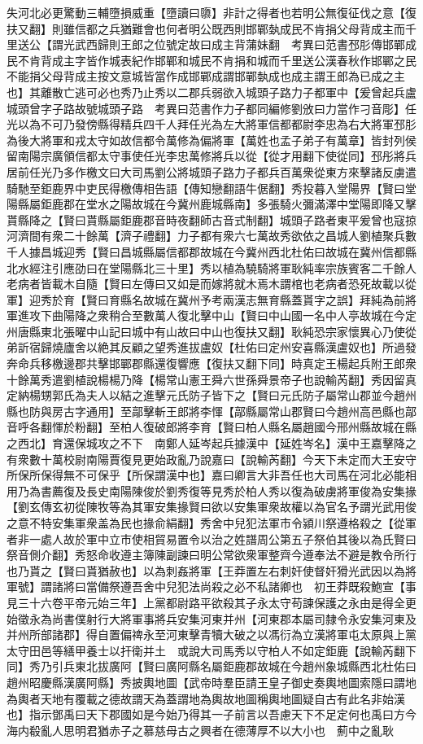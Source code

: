 失河北必更驚動三輔墮損威重【墮讀曰隳】非計之得者也若明公無復征伐之意【復扶又翻】則雖信都之兵猶難會也何者明公既西則邯鄲埶成民不肯捐父母背成主而千里送公【謂光武西歸則王郎之位號定故曰成主背蒲妹翻　考異曰范書邳肜傳邯鄲成民不肯背成主字皆作城表紀作邯鄲和城民不肯捐和城而千里送公漢春秋作邯鄲之民不能捐父母背成主按文意城皆當作成邯鄲成謂邯鄲埶成也成主謂王郎為已成之主也】其離散亡逃可必也秀乃止秀以二郡兵弱欲入城頭子路力子都軍中【爰曾起兵盧城頭曾字子路故號城頭子路　考異曰范書作力子都同編修劉攽曰力當作刁音彫】任光以為不可乃發傍縣得精兵四千人拜任光為左大將軍信都都尉李忠為右大將軍邳肜為後大將軍和戎太守如故信都令萬修為偏將軍【萬姓也孟子弟子有萬章】皆封列侯留南陽宗廣領信都太守事使任光李忠萬修將兵以從【從才用翻下使從同】邳彤將兵居前任光乃多作檄文曰大司馬劉公將城頭子路力子都兵百萬衆從東方來擊諸反虜遣騎馳至鉅鹿界中吏民得檄傳相告語【傳知戀翻語牛倨翻】秀投暮入堂陽界【賢曰堂陽縣屬鉅鹿郡在堂水之陽故城在今冀州鹿城縣南】多張騎火彌滿澤中堂陽即降又擊貰縣降之【賢曰貰縣屬鉅鹿郡音時夜翻師古音式制翻】城頭子路者東平爰曾也寇掠河濟間有衆二十餘萬【濟子禮翻】力子都有衆六七萬故秀欲依之昌城人劉植聚兵數千人據昌城迎秀【賢曰昌城縣屬信都郡故城在今冀州西北杜佑曰故城在冀州信都縣北水經注引應劭曰在堂陽縣北三十里】秀以植為驍騎將軍耿純率宗族賓客二千餘人老病者皆載木自隨【賢曰左傳曰又如是而嫁將就木焉木謂棺也老病者恐死故載以從軍】迎秀於育【賢曰育縣名故城在冀州予考兩漢志無育縣蓋貰字之誤】拜純為前將軍進攻下曲陽降之衆稍合至數萬人復北擊中山【賢曰中山國一名中人亭故城在今定州唐縣東北張曜中山記曰城中有山故曰中山也復扶又翻】耿純恐宗家懷異心乃使從弟訢宿歸燒廬舍以絶其反顧之望秀進拔盧奴【杜佑曰定州安喜縣漢盧奴也】所過發奔命兵移檄邊郡共擊邯鄲郡縣還復響應【復扶又翻下同】時真定王楊起兵附王郎衆十餘萬秀遣劉植說楊楊乃降【楊常山憲王舜六世孫舜景帝子也說輸芮翻】秀因留真定納楊甥郭氏為夫人以結之進擊元氏防子皆下之【賢曰元氏防子屬常山郡並今趙州縣也防與房古字通用】至鄗擊斬王郎將李惲【鄗縣屬常山郡賢曰今趙州高邑縣也鄗音呼各翻惲於粉翻】至柏人復破郎將李育【賢曰柏人縣名屬趙國今邢州縣故城在縣之西北】育還保城攻之不下　南鄭人延岑起兵據漢中【延姓岑名】漢中王嘉擊降之有衆數十萬校尉南陽賈復見更始政亂乃說嘉曰【說輸芮翻】今天下未定而大王安守所保所保得無不可保乎【所保謂漢中也】嘉曰卿言大非吾任也大司馬在河北必能相用乃為書薦復及長史南陽陳俊於劉秀復等見秀於柏人秀以復為破虜將軍俊為安集掾【劉玄傳玄初從陳牧等為其軍安集掾賢曰欲以安集軍衆故權以為官名予謂光武用俊之意不特安集軍衆盖為民也掾俞絹翻】秀舍中兒犯法軍市令潁川祭遵格殺之【從軍者非一處人故於軍中立市使相貿易置令以治之姓譜周公第五子祭伯其後以為氏賢曰祭音側介翻】秀怒命收遵主簿陳副諫曰明公常欲衆軍整齊今遵奉法不避是教令所行也乃貰之【賢曰貰猶赦也】以為刺姦將軍【王莽置左右刺奸使督奸猾光武因以為將軍號】謂諸將曰當備祭遵吾舍中兒犯法尚殺之必不私諸卿也　初王莽既殺鮑宣【事見三十六卷平帝元始三年】上黨都尉路平欲殺其子永太守苟諫保護之永由是得全更始徵永為尚書僕射行大將軍事將兵安集河東并州【河東郡本屬司隸令永安集河東及并州所部諸郡】得自置偏禆永至河東擊青犢大破之以馮衍為立漢將軍屯太原與上黨太守田邑等繕甲養士以扞衛并土　或說大司馬秀以守柏人不如定鉅鹿【說輸芮翻下同】秀乃引兵東北拔廣阿【賢曰廣阿縣名屬鉅鹿郡故城在今趙州象城縣西北杜佑曰趙州昭慶縣漢廣阿縣】秀披輿地圖【武帝時羣臣請王皇子御史奏輿地圖索隱曰謂地為輿者天地有覆載之德故謂天為蓋謂地為輿故地圖稱輿地圖疑自古有此名非始漢也】指示鄧禹曰天下郡國如是今始乃得其一子前言以吾慮天下不足定何也禹曰方今海内殽亂人思明君猶赤子之慕慈母古之興者在德薄厚不以大小也　薊中之亂耿